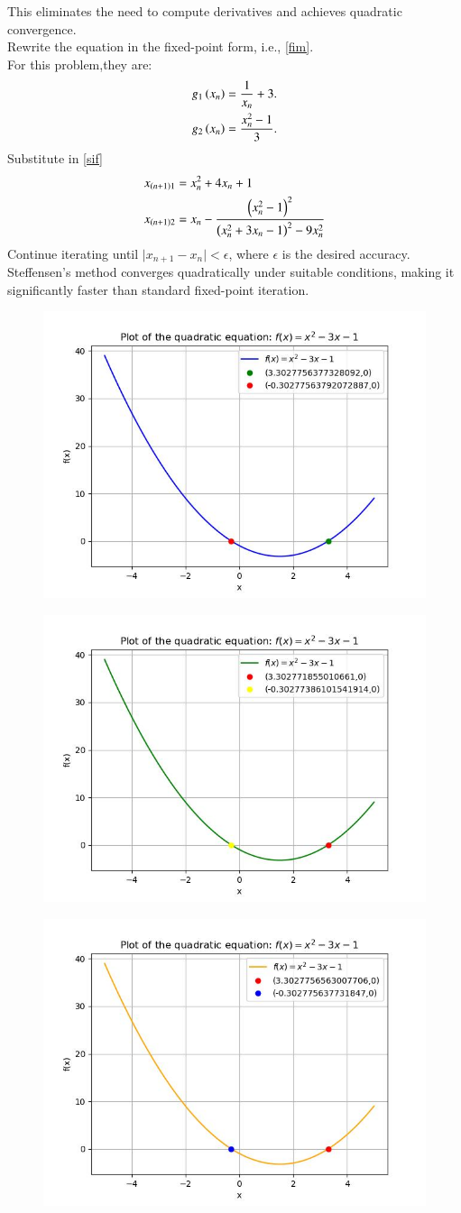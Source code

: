 \documentclass[journal,12pt,onecolumn]{IEEEtran}
\theoremstyle{remark}
\begin{document}
This eliminates the need to compute derivatives and achieves quadratic convergence.\\Rewrite the equation in the fixed-point form, i.e., \ref{fim}.\\
For this problem,they are:
\begin{align}
g_1\left(x_n\right) &= \frac{1}{x_n} + 3.\\
g_2\left(x_n\right) &= \frac{x_n^2-1}{3}.
\end{align}
Substitute in \ref{sif}
\begin{align}
x_{\left(n+1\right)1}&=x_n^2+4x_n+1\\
x_{\left(n+1\right)2}&=x_n -\frac{\left(x_n^2-1\right)^2}{\left(x_n^2+3x_n-1\right)^2-9x_n^2}
\end{align}
Continue iterating until $ \lvert x_{n+1} - x_n\rvert < \epsilon $, where $ \epsilon $ is the desired accuracy.
Steffensen's method converges quadratically under suitable conditions, making it significantly faster than standard fixed-point iteration.


\begin{figure}[h] %
    \centering %
    \includegraphics[width=0.5\columnwidth]{figs/Newton-Raphson.jpeg} %
    \label{fig:example_image} %
\end{figure}

\begin{figure}[h] %
    \centering %
    \includegraphics[width=0.5\columnwidth]{figs/fpi.jpeg} %
    \label{fig:example_image} %
\end{figure}

\begin{figure}[h] %
    \centering %
    \includegraphics[width=0.5\columnwidth]{figs/steffenson.jpeg} %
    \label{fig:example_image} %
\end{figure}
\end{document}
